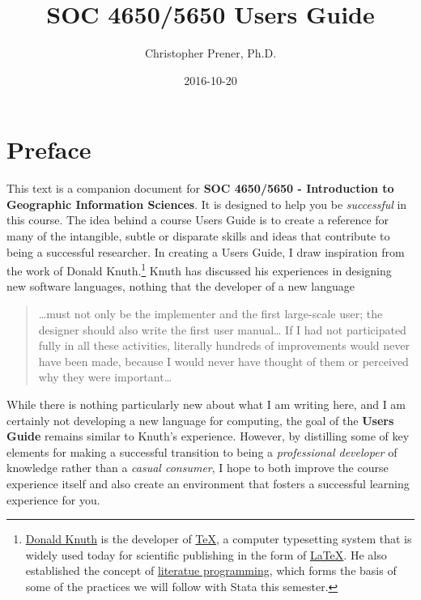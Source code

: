 \documentclass[]{book}
\title{SOC 4650/5650 Users Guide}
\author{Christopher Prener, Ph.D.}
\date{2016-10-20}
\let\rmarkdownfootnote\footnote%
\def\footnote{\protect\rmarkdownfootnote}
\begin{document}
\maketitle

{
\setcounter{tocdepth}{1}
\tableofcontents
}
\chapter*{Preface}\label{preface}

This text is a companion document for \textbf{SOC 4650/5650 -
Introduction to Geographic Information Sciences}. It is designed to help
you be \emph{successful} in this course. The idea behind a course Users
Guide is to create a reference for many of the intangible, subtle or
disparate skills and ideas that contribute to being a successful
researcher. In creating a Users Guide, I draw inspiration from the work
of Donald Knuth.\footnote{\href{https://en.wikipedia.org/wiki/Donald_Knuth}{Donald
  Knuth} is the developer of
  \href{https://en.wikipedia.org/wiki/TeX}{TeX}, a computer typesetting
  system that is widely used today for scientific publishing in the form
  of \href{https://en.wikipedia.org/wiki/LaTeX}{LaTeX}. He also
  established the concept of
  \href{https://en.wikipedia.org/wiki/Literate_programming}{literatue
  programming}, which forms the basis of some of the practices we will
  follow with Stata this semester.} Knuth has discussed his experiences
in designing new software languages, nothing that the developer of a new
language

\begin{quote}
\ldots{}must not only be the implementer and the first large-scale user;
the designer should also write the first user manual\ldots{} If I had
not participated fully in all these activities, literally hundreds of
improvements would never have been made, because I would never have
thought of them or perceived why they were important\ldots{}
\end{quote}

While there is nothing particularly new about what I am writing here,
and I am certainly not developing a new language for computing, the goal
of the \textbf{Users Guide} remains similar to Knuth's experience.
However, by distilling some of key elements for making a successful
transition to being a \emph{professional developer} of knowledge rather
than a \emph{casual consumer}, I hope to both improve the course
experience itself and also create an environment that fosters a
successful learning experience for you.
\end{document}

